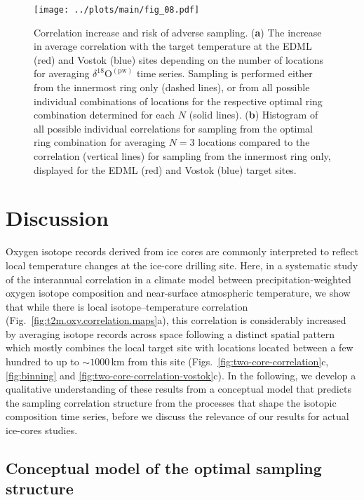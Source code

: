 \documentclass[cp, manuscript]{copernicus}
\begin{document}
\begin{figure*}[t]%
\centering
\texttt{[image: ../plots/main/fig\_08.pdf]}
\caption{%
  Correlation increase and risk of adverse sampling. (\textbf{a}) The increase
  in average correlation with the target temperature at the EDML (red) and
  Vostok (blue) sites depending on the number of locations for averaging
  $\delta^{18}\mathrm{O}^{\mathrm{(pw)}}$ time series. Sampling is performed
  either from the innermost ring only (dashed lines), or from all possible
  individual combinations of locations for the respective optimal ring
  combination determined for each $N$ (solid lines). (\textbf{b}) Histogram of
  all possible individual correlations for sampling from the optimal ring
  combination for averaging $N=3$ locations compared to the correlation
  (vertical lines) for sampling from the innermost ring only, displayed for the
  EDML (red) and Vostok (blue) target sites.}
\label{fig:cor.increase.risk}%
\end{figure*}%

\section{Discussion}\label{discussion}

Oxygen isotope records derived from ice cores are commonly interpreted to
reflect local temperature changes at the ice-core drilling site. Here, in a
systematic study of the interannual correlation in a climate model between
precipitation-weighted oxygen isotope composition and near-surface atmospheric
temperature, we show that while there is local isotope--temperature correlation
(Fig.~\ref{fig:t2m.oxy.correlation.maps}a), this correlation is considerably
increased by averaging isotope records across space following a distinct spatial
pattern which mostly combines the local target site with locations located
between a few hundred to up to $\sim1000$\,km from this site
(Figs.~\ref{fig:two-core-correlation}c, \ref{fig:binning} and
\ref{fig:two-core-correlation-vostok}c). In the following, we develop a
qualitative understanding of these results from a conceptual model that predicts
the sampling correlation structure from the processes that shape the isotopic
composition time series, before we discuss the relevance of our results for
actual ice-cores studies.

\subsection{Conceptual model of the optimal sampling structure}
\label{discussion:concept.model}
\end{document}
